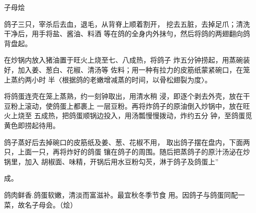 \begin{recipe}{子母烩}

\ingredients


\cooking

\step 鸽子三只，宰杀后去血，退毛，从背脊上顺着割开， 挖去五脏，去掉足爪；清洗干净后，用手将盐、酱油、料酒 等在鸽的全身内外抹勻，然后将鸽的两翅翻向鸽背盘起。

在炒锅内放入猪油置于旺火上烧至七、八成热，将鸽子 炸五分钟捞起，用蒸碗装好，加入姜、葱白、花椒、清汤等 佐料；用一种有拉力的皮筋纸蒙紧碗口，在笼上蒸约两小时 半〈根据鸽的老嫩增减蒸的时间，以骨松翅裂为度〉。

\step 将鸽蛋连壳在笼上蒸熟，约一刻钟取出，用清水稍 浸，即逐个剥去外壳，放在干豆粉上滚动，使鸽蛋上都裹上 一层豆粉。再将炸鸽子的原油倒入炒锅中，放在旺火上烧至 五成热，把鸽蛋顺锅边投入，用汤瓢慢慢拨动，炸约五分 钟，至鸽蛋觅黄色即捞起待用。

\step 鸽子蒸好后去掉碗口的皮筋纸及姜、葱、花椒不用， 取出鸽子摆在盘内，下面两只，上面一只，再将炸好的鸽蛋 镶在鸽子的周围。随后把蒸鸽子的原汁汤泌在炒锅里，加入 胡椒面、味精，开锅后用水豆粉勾芡，淋于鸽子及鸽蛋上”

成。

\notes

鸽肉鲜香.鸽蛋软嫩，清淡而富滋补。最宜秋冬季节食 用。因鸽子与鸽蛋同配一菜，故名子母会。（烩）

\end{recipe}


